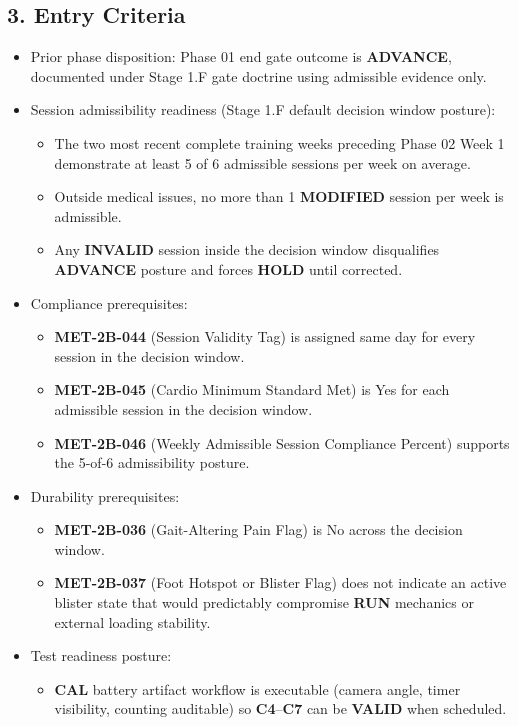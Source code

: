 \documentclass[10pt]{article}
\begin{document}
\subsection*{3. Entry Criteria}

\begin{itemize}
\item Prior phase disposition: Phase 01 end gate outcome is \textbf{ADVANCE}, documented under Stage 1.F gate doctrine using admissible evidence only.
\item Session admissibility readiness (Stage 1.F default decision window posture):
\begin{itemize}
\item The two most recent complete training weeks preceding Phase 02 Week 1 demonstrate at least 5 of 6 admissible sessions per week on average.
\item Outside medical issues, no more than 1 \textbf{MODIFIED} session per week is admissible.
\item Any \textbf{INVALID} session inside the decision window disqualifies \textbf{ADVANCE} posture and forces \textbf{HOLD} until corrected.
\end{itemize}
\item Compliance prerequisites:
\begin{itemize}
\item \textbf{MET-2B-044} (Session Validity Tag) is assigned same day for every session in the decision window.
\item \textbf{MET-2B-045} (Cardio Minimum Standard Met) is Yes for each admissible session in the decision window.
\item \textbf{MET-2B-046} (Weekly Admissible Session Compliance Percent) supports the 5-of-6 admissibility posture.
\end{itemize}
\item Durability prerequisites:
\begin{itemize}
\item \textbf{MET-2B-036} (Gait-Altering Pain Flag) is No across the decision window.
\item \textbf{MET-2B-037} (Foot Hotspot or Blister Flag) does not indicate an active blister state that would predictably compromise \textbf{RUN} mechanics or external loading stability.
\end{itemize}
\item Test readiness posture:
\begin{itemize}
\item \textbf{CAL} battery artifact workflow is executable (camera angle, timer visibility, counting auditable) so \textbf{C4}–\textbf{C7} can be \textbf{VALID} when scheduled.

\end{itemize}
\end{itemize}
\end{document}
